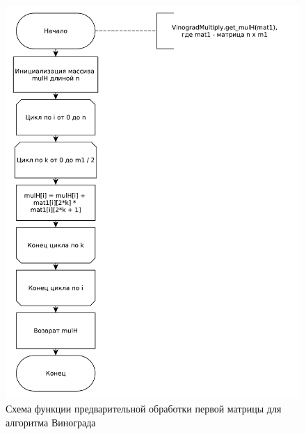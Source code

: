 \documentclass[12pt]{report}
\begin{document}
    \begin{figure}[H]
        \centering
        \includegraphics[width=0.8\linewidth]{img/vinograd_get_mulh}
        \caption{
                Схема функции предварительной обработки первой матрицы для алгоритма Винограда
            }
        \label{fig:vin_mulh}
    \end{figure}
\end{document}
